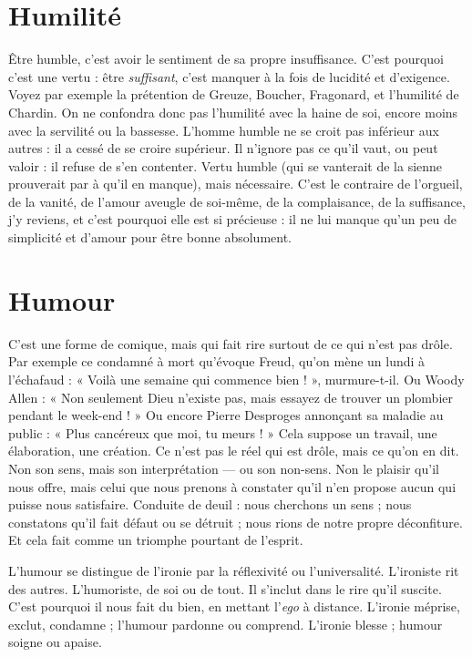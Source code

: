 \section{Humilité}
Être humble, c’est avoir le sentiment de sa propre insuffisance.
C’est pourquoi c’est une vertu : être {\it suffisant}, c'est manquer à
la fois de lucidité et d’exigence. Voyez par exemple la prétention de Greuze,
Boucher, Fragonard, et l'humilité de Chardin. On ne confondra donc pas
l’humilité avec la haine de soi, encore moins avec la servilité ou la bassesse.
L’homme humble ne se croit pas inférieur aux autres : il a cessé de se croire
supérieur. Il n’ignore pas ce qu’il vaut, ou peut valoir : il refuse de s’en
contenter. Vertu humble (qui se vanterait de la sienne prouverait par à qu’il en
manque), mais nécessaire. C’est le contraire de l’orgueil, de la vanité, de
l’amour aveugle de soi-même, de la complaisance, de la suffisance, j'y reviens,
et c'est pourquoi elle est si précieuse : il ne lui manque qu’un peu de simplicité
et d’amour pour être bonne absolument.

\section{Humour}
C'est une forme de comique, mais qui fait rire surtout de ce qui
n'est pas drôle. Par exemple ce condamné à mort qu’évoque
Freud, qu’on mène un lundi à l’échafaud : « Voilà une semaine qui commence
bien ! », murmure-t-il. Ou Woody Allen : « Non seulement Dieu n'existe pas,
mais essayez de trouver un plombier pendant le week-end ! » Ou encore Pierre
Desproges annonçant sa maladie au public : « Plus cancéreux que moi, tu
meurs ! » Cela suppose un travail, une élaboration, une création. Ce n’est pas le
réel qui est drôle, mais ce qu’on en dit. Non son sens, mais son interprétation
— ou son non-sens. Non le plaisir qu’il nous offre, mais celui que nous prenons
à constater qu’il n’en propose aucun qui puisse nous satisfaire. Conduite de
deuil : nous cherchons un sens ; nous constatons qu’il fait défaut ou se détruit ;
nous rions de notre propre déconfiture. Et cela fait comme un triomphe pourtant
de l'esprit.

L'humour se distingue de l'ironie par la réflexivité ou l’universalité. L’ironiste
rit des autres. L’humoriste, de soi ou de tout. Il s’inclut dans le rire qu’il
suscite. C’est pourquoi il nous fait du bien, en mettant l’{\it ego} à distance. L’ironie
méprise, exclut, condamne ; l’humour pardonne ou comprend. L’ironie blesse ;
humour soigne ou apaise.

